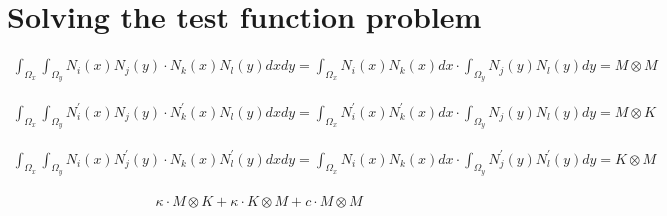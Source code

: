 \section{Solving the test function problem}

\begin{align}
	\int_{\Omega_x}  \int_{\Omega_y} N_i(x) N_j(y) \cdot N_k(x) N_l(y) dx dy = 
	\int_{\Omega_x}  N_i(x) N_k(x) dx \cdot \int_{\Omega_y} N_j(y)  N_l(y) dy = M \otimes M
\end{align}


\begin{align}
	\int_{\Omega_x}  \int_{\Omega_y} N^\prime_i(x) N_j(y) \cdot N_k^\prime(x) N_l(y) dx dy = 
	\int_{\Omega_x}  N^\prime_i(x) N^\prime_k(x) dx \cdot \int_{\Omega_y} N_j(y)  N_l(y) dy = M \otimes K
\end{align}

\begin{align}
	\int_{\Omega_x}  \int_{\Omega_y} N_i(x) N^\prime_j(y) \cdot N_k(x) N^\prime_l(y) dx dy = 
	\int_{\Omega_x}  N_i(x) N_k(x) dx \cdot \int_{\Omega_y} N^\prime_j(y)  N^\prime_l(y) dy = K \otimes M
\end{align}

\begin{align}
	\kappa \cdot M \otimes K + \kappa \cdot K \otimes M + c \cdot M \otimes M
\end{align}

